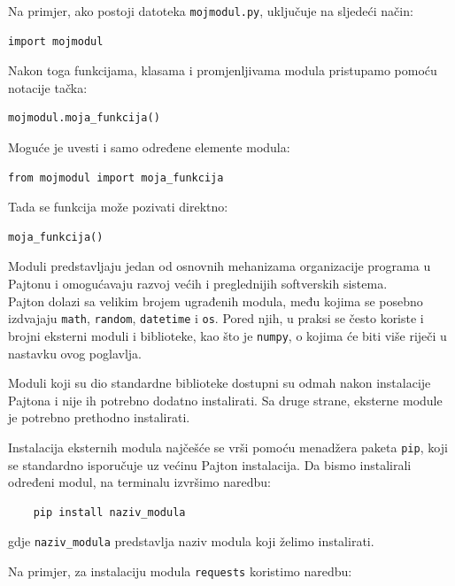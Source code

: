 Na primjer, ako postoji datoteka \texttt{mojmodul.py},  uključuje na sljedeći način:

\begin{verbatim}
import mojmodul
\end{verbatim}

Nakon toga funkcijama, klasama i promjenljivama modula pristupamo pomoću notacije tačka:

\begin{verbatim}
mojmodul.moja_funkcija()
\end{verbatim}

Moguće je uvesti i samo određene elemente modula:

\begin{verbatim}
from mojmodul import moja_funkcija
\end{verbatim}

Tada se funkcija može pozivati direktno:

\begin{verbatim}
moja_funkcija()
\end{verbatim}

Moduli predstavljaju jedan od osnovnih mehanizama organizacije programa u Pajtonu i omogućavaju razvoj većih i preglednijih softverskih sistema.\\


Pajton dolazi sa velikim brojem ugrađenih modula, među kojima se posebno izdvajaju \texttt{math}, \texttt{random}, \texttt{datetime} i \texttt{os}. Pored njih, u praksi se često koriste i brojni eksterni moduli i biblioteke, kao što je \texttt{numpy}, o kojima će biti više riječi u nastavku ovog poglavlja.

Moduli koji su dio standardne biblioteke dostupni su odmah nakon instalacije Pajtona i nije ih potrebno dodatno instalirati. Sa druge strane, eksterne module je potrebno prethodno instalirati.

Instalacija eksternih modula najčešće se vrši pomoću menadžera paketa \texttt{pip}, koji se standardno isporučuje uz većinu Pajton instalacija. Da bismo instalirali određeni modul, na terminalu izvršimo naredbu:

\begin{verbatim}
	pip install naziv_modula
\end{verbatim}

gdje \texttt{naziv\_modula} predstavlja naziv modula koji želimo instalirati.

Na primjer, za instalaciju modula \texttt{requests} koristimo naredbu:

